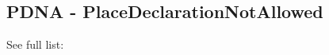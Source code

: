 \newpage
\subsection{PDNA - PlaceDeclarationNotAllowed}\label{sec:error_code_pdna}


See full list: 
